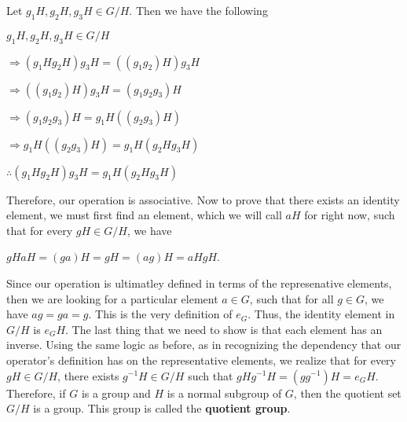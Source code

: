 \documentclass[12pt, a4paper]{article}
\begin{document}
\newpage

    Let $g_1H,g_2H,g_3H\in G/H$. Then we have the following\par
    
\vspace{4mm}

\hspace{2mm} $g_1H,g_2H,g_3H\in G/H$\par
\vspace{2mm}
\hspace{10mm} $\Rightarrow (g_1Hg_2H)g_3H=((g_1g_2)H)g_3H$\par
\vspace{2mm}
\hspace{10mm} $\Rightarrow ((g_1g_2)H)g_3H=(g_1g_2g_3)H$\par
\vspace{2mm}
\hspace{10mm} $\Rightarrow (g_1g_2g_3)H=g_1H((g_2g_3)H)$\par
\vspace{2mm}
\hspace{10mm} $\Rightarrow g_1H((g_2g_3)H)=g_1H(g_2Hg_3H)$\par
\vspace{2mm}
\hspace{2mm} $\therefore (g_1Hg_2H)g_3H=g_1H(g_2Hg_3H)$\par

\vspace{4mm}

    Therefore, our operation is associative. Now to prove that there exists an identity element, we must first find an element, which we will call $aH$ for right now, such that for every $gH\in G/H$, we have\par
    
\vspace{4mm}

        \centerline{$gHaH=(ga)H=gH=(ag)H=aHgH$.}
        
\vspace{4mm}

    Since our operation is ultimatley defined in terms of the represenative elements, then we are looking for a particular element $a\in G$, such that for all $g\in G$, we have $ag=ga=g$. This is the very definition of $e_G$. Thus, the identity element in $G/H$ is $e_GH$. The last thing that we need to show is that each element has an inverse. Using the same logic as before, as in recognizing the dependency that our operator's definition has on the representative elements, we realize that for every $gH\in G/H$, there exists $g^{-1}H\in G/H$ such that $gHg^{-1}H=(gg^{-1})H=e_GH$. Therefore, if $G$ is a group and $H$ is a normal subgroup of $G$, then the quotient set $G/H$ is a group. This group is called the \textbf{quotient group}.\par
    
\end{document}
